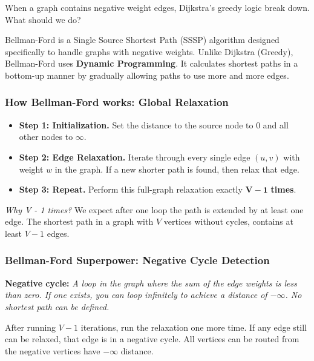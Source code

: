 \vspace{0.2cm}
When a graph contains negative weight edges, Dijkstra's greedy logic break down. What should we do?

Bellman-Ford is a Single Source Shortest Path (SSSP) algorithm designed specifically to handle graphs with negative weights. Unlike Dijkstra (Greedy), Bellman-Ford uses \textbf{Dynamic Programming}. It calculates shortest paths in a bottom-up manner by gradually allowing paths to use more and more edges.

\subsubsection{How Bellman-Ford works: Global Relaxation}
\begin{itemize}
    \item \textbf{Step 1: Initialization.} Set the distance to the source node to $0$ and all other nodes to $\infty$.
    \item \textbf{Step 2: Edge Relaxation.} Iterate through every single edge $(u, v)$ with weight $w$ in the graph. If a new shorter path is found, then relax that edge.
    \item \textbf{Step 3: Repeat.} Perform this full-graph relaxation exactly $\mathbf{V - 1}$ \textbf{times}.
\end{itemize}

\textit{Why V - 1 times?} We expect after one loop the path is extended by at least one edge. The shortest path in a graph with $V$ vertices without cycles, contains at least $V - 1$ edges.

\subsubsection{Bellman-Ford Superpower: Negative Cycle Detection}
\textbf{Negative cycle:} \textit{A loop in the graph where the sum of the edge weights is less than zero. If one exists, you can loop infinitely to achieve a distance of $-\infty$. No shortest path can be defined.}

After running $V - 1$ iterations, run the relaxation one more time. If any edge still can be relaxed, that edge is in a negative cycle. All vertices can be routed from the negative vertices have $-\infty$ distance.

